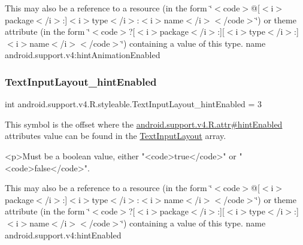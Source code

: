 This may also be a reference to a resource (in the form \char`\"{}$<$code$>$@\mbox{[}$<$i$>$package$<$/i$>$\+:\mbox{]}$<$i$>$type$<$/i$>$\+:$<$i$>$name$<$/i$>$$<$/code$>$\char`\"{}) or theme attribute (in the form \char`\"{}$<$code$>$?\mbox{[}$<$i$>$package$<$/i$>$\+:\mbox{]}\mbox{[}$<$i$>$type$<$/i$>$\+:\mbox{]}$<$i$>$name$<$/i$>$$<$/code$>$\char`\"{}) containing a value of this type.  name android.\+support.\+v4\+:hint\+Animation\+Enabled \mbox{\label{classandroid_1_1support_1_1v4_1_1R_1_1styleable_a9b9008f58fe52182cb029310ed5338c2}} 
\subsubsection{\texorpdfstring{Text\+Input\+Layout\+\_\+hint\+Enabled}{TextInputLayout\_hintEnabled}}
{\footnotesize\ttfamily int android.\+support.\+v4.\+R.\+styleable.\+Text\+Input\+Layout\+\_\+hint\+Enabled = 3\hspace{0.3cm}{\ttfamily [static]}}

This symbol is the offset where the \hyperlink{classandroid_1_1support_1_1v4_1_1R_1_1attr_a5f4a8cb83603d7a45db4b5284ebe1a41}{android.\+support.\+v4.\+R.\+attr\#hint\+Enabled} attribute\textquotesingle{}s value can be found in the \hyperlink{classandroid_1_1support_1_1v4_1_1R_1_1styleable_a86943debf88d7a9dc4c0627a8546913d}{Text\+Input\+Layout} array.

\begin{DoxyVerb}      <p>Must be a boolean value, either "<code>true</code>" or "<code>false</code>".
\end{DoxyVerb}
 

This may also be a reference to a resource (in the form \char`\"{}$<$code$>$@\mbox{[}$<$i$>$package$<$/i$>$\+:\mbox{]}$<$i$>$type$<$/i$>$\+:$<$i$>$name$<$/i$>$$<$/code$>$\char`\"{}) or theme attribute (in the form \char`\"{}$<$code$>$?\mbox{[}$<$i$>$package$<$/i$>$\+:\mbox{]}\mbox{[}$<$i$>$type$<$/i$>$\+:\mbox{]}$<$i$>$name$<$/i$>$$<$/code$>$\char`\"{}) containing a value of this type.  name android.\+support.\+v4\+:hint\+Enabled \mbox{\label{classandroid_1_1support_1_1v4_1_1R_1_1styleable_af051809dff99b96f096bb56e82505858}} 

